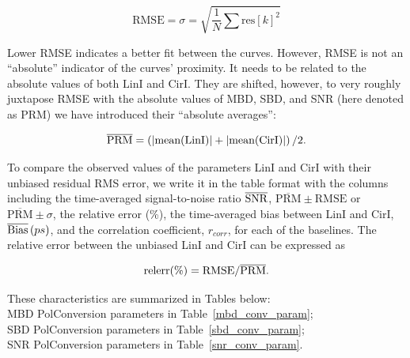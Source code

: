 \documentclass[letterpaper,twoside,12pt]{article}
\begin{document}
\begin{equation}
  \label{rmse}
  \mathrm{RMSE} = \sigma = \sqrt{\frac{1}{N} \sum \mathrm{res}[k]^2}
\end{equation}

Lower RMSE indicates a better fit between the curves. However, RMSE is not an ``absolute'' indicator of the curves' proximity. It needs to be related to the absolute values of both $\mathrm{LinI}$ and $\mathrm{CirI}$. They are shifted, however, to very roughly juxtapose RMSE with the absolute values of MBD, SBD, and SNR (here denoted as PRM) we have introduced their ``absolute averages'':

\begin{equation}
  \label{abs_avg}
  \overline{\mathrm{PRM}} = \left( \rm |mean(LinI)| + |mean(CirI)| \right)/2.
\end{equation}

To compare the observed values of the parameters LinI and CirI with their unbiased residual RMS error, we write it in the table format with the columns including the time-averaged signal-to-noise ratio $\overline{\rm{SNR}}$, $\overline{\mathrm{PRM}} \pm \mathrm{RMSE}$ or $\overline{\mathrm{PRM}} \pm \sigma$, the relative error (\%), the time-averaged bias between LinI and CirI, $\overline{\rm{Bias}}\, (ps)$, and the correlation coefficient, $r_{corr}$, for each of the baselines. The relative error between the unbiased LinI and CirI can be expressed as

\begin{equation}
  \label{rel_err}
  \rm relerr (\%) = RMSE / \overline{\mathrm{PRM}}.
\end{equation}

These characteristics are summarized in Tables below: \\

\noindent MBD PolConversion parameters in Table~\ref{mbd_conv_param}; \\
\noindent SBD PolConversion parameters in Table~\ref{sbd_conv_param}; \\
\noindent SNR PolConversion parameters in Table~\ref{snr_conv_param}. \\
\end{document}
